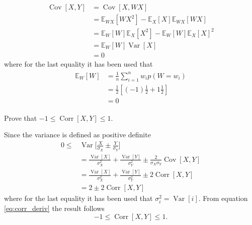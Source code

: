 \begin{example}
\begin{enumerate}
		\begin{equation}
			\begin{split}
				\operatorname{Cov}[X,Y] &= \operatorname{Cov}[X,WX] \\
				&= \mathbb{E}_{WX}[WX^2]-\mathbb{E}_X[X]\mathbb{E}_{WX}[WX]\\
				&= \mathbb{E}_W[W]\mathbb{E}_X[X^2]-\mathbb{E}_W[W]\mathbb{E}_X[X]^2\\
				&= \mathbb{E}_W[W]\operatorname{Var}[X]\\
				& = 0
			\end{split}
		\end{equation}
		where for the last equality it has been used that
		\begin{equation}
			\begin{split}
				\begin{split}
					\mathbb{E}_W[W]&= \frac{1}{n}\sum_{i=1}^nw_ip(W = w_i)\\
					&= \frac{1}{2}[(-1)\frac{1}{2}+1\frac{1}{2}]\\
					&= 0
				\end{split}
			\end{split}
		\end{equation}
		
	\end{enumerate}
	
\end{example}

\begin{example}
	Prove that $-1\leq \operatorname{Corr}[X,Y]\leq 1$.\newline
	
	Since the variance is defined as positive definite
	\begin{equation}
		\label{eq:corr_deriv}
		\begin{split}
			0\leq& \operatorname{Var}\bigg[\frac{X}{\sigma_X}\pm\frac{Y}{\sigma_Y}\bigg]\\
			& = \frac{\operatorname{Var}[X]}{\sigma_X^2}+\frac{\operatorname{Var}[Y]}{\sigma_Y^2}\pm \frac{2}{\sigma_X\sigma_Y}\operatorname{Cov}[X,Y]\\
			& = \frac{\operatorname{Var}[X]}{\sigma_X^2}+\frac{\operatorname{Var}[Y]}{\sigma_Y^2}\pm 2\operatorname{Corr}[X,Y]\\
			& = 2\pm 2\operatorname{Corr}[X,Y]
		\end{split}
	\end{equation}
	where for the last equality it has been used that $\sigma_i^2=\operatorname{Var}[i]$. From equation \eqref{eq:corr_deriv} the result follows
	\begin{equation}
		-1\leq \operatorname{Corr}[X,Y]\leq 1.
	\end{equation}	
\end{example}

